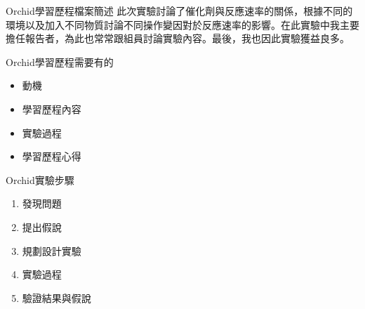 \documentclass{article}
\begin{document}

\begin{large}
\begin{boxpar}{Orchid}{學習歷程檔案簡述}
    此次實驗討論了催化劑與反應速率的關係，根據不同的環境以及加入不同物質討論不同操作變因對於反應速率的影響。在此實驗中我主要擔任報告者，為此也常常跟組員討論實驗內容。最後，我也因此實驗獲益良多。
\end{boxpar}
\begin{boxpar}{Orchid}{學習歷程需要有的}
    \begin{itemize}
\item 動機
\item 學習歷程內容
\item 實驗過程
\item 學習歷程心得
    \end {itemize}
\end{boxpar}
\begin{boxpar}{Orchid}{實驗步驟}
    \begin{enumerate}
\item 發現問題
\item 提出假說
\item 規劃設計實驗
\item 實驗過程
\item 驗證結果與假說
    \end {enumerate}
\end{boxpar}
\end{large}
\end{document}
